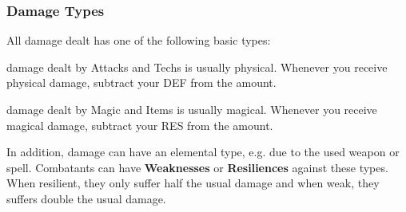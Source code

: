 \subsubsection*{Damage Types} 
All damage dealt has one of the following basic types:
%
\begin{description}[leftmargin=*]
	\item[\accf{Physical}:] damage dealt by Attacks and Techs is usually physical. 
	Whenever you receive physical damage, subtract your DEF from the amount.
	
	\item[\accf{Magical}:] damage dealt by Magic and Items is usually magical. 
	Whenever you receive magical damage, subtract your RES from the amount.
\end{description}
%
\noindent
In addition, damage can have an elemental type, e.g. due to the used weapon or spell.
Combatants can have \textbf{Weaknesses} or \textbf{Resiliences} against these types. 
When resilient, they only suffer half the usual damage and when weak, they suffers double the usual damage. 
%
\vspace{0.3cm}
%
